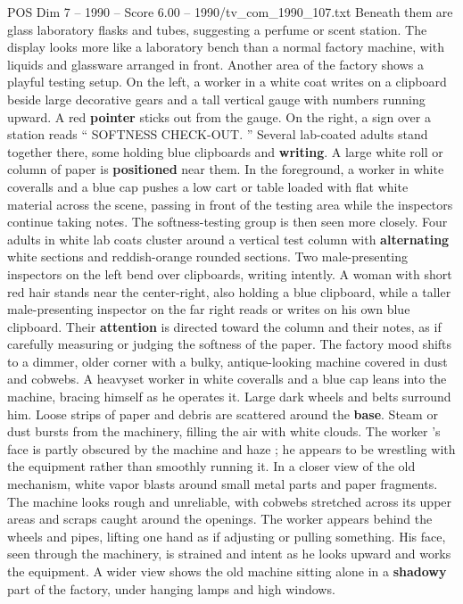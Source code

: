 \begin{textsample}{POS Dim 7 – 1990 – Score 6.00 – 1990/tv\_com\_1990\_107.txt}
Beneath them are glass laboratory flasks and tubes, suggesting a perfume or scent station.
The display looks more like a laboratory bench than a normal factory machine, with liquids and glassware arranged in front.
Another area of the factory shows a playful testing setup.
On the left, a worker in a white coat writes on a clipboard beside large decorative gears and a tall vertical gauge with numbers running upward.
A red \textbf{pointer} sticks out from the gauge.
On the right, a sign over a station reads “ SOFTNESS CHECK-OUT. ” Several lab-coated adults stand together there, some holding blue clipboards and \textbf{writing}.
A large white roll or column of paper is \textbf{positioned} near them.
In the foreground, a worker in white coveralls and a blue cap pushes a low cart or table loaded with flat white material across the scene, passing in front of the testing area while the inspectors continue taking notes.
The softness-testing group is then seen more closely.
Four adults in white lab coats cluster around a vertical test column with \textbf{alternating} white sections and reddish-orange rounded sections.
Two male-presenting inspectors on the left bend over clipboards, writing intently.
A woman with short red hair stands near the center-right, also holding a blue clipboard, while a taller male-presenting inspector on the far right reads or writes on his own blue clipboard.
Their \textbf{attention} is directed toward the column and their notes, as if carefully measuring or judging the softness of the paper.
The factory mood shifts to a dimmer, older corner with a bulky, antique-looking machine covered in dust and cobwebs.
A heavyset worker in white coveralls and a blue cap leans into the machine, bracing himself as he operates it.
Large dark wheels and belts surround him.
Loose strips of paper and debris are scattered around the \textbf{base}.
Steam or dust bursts from the machinery, filling the air with white clouds.
The worker ’s face is partly obscured by the machine and haze ; he appears to be wrestling with the equipment rather than smoothly running it.
In a closer view of the old mechanism, white vapor blasts around small metal parts and paper fragments.
The machine looks rough and unreliable, with cobwebs stretched across its upper areas and scraps caught around the openings.
The worker appears behind the wheels and pipes, lifting one hand as if adjusting or pulling something.
His face, seen through the machinery, is strained and intent as he looks upward and works the equipment.
A wider view shows the old machine sitting alone in a \textbf{shadowy} part of the factory, under hanging lamps and high windows.

\end{textsample}
